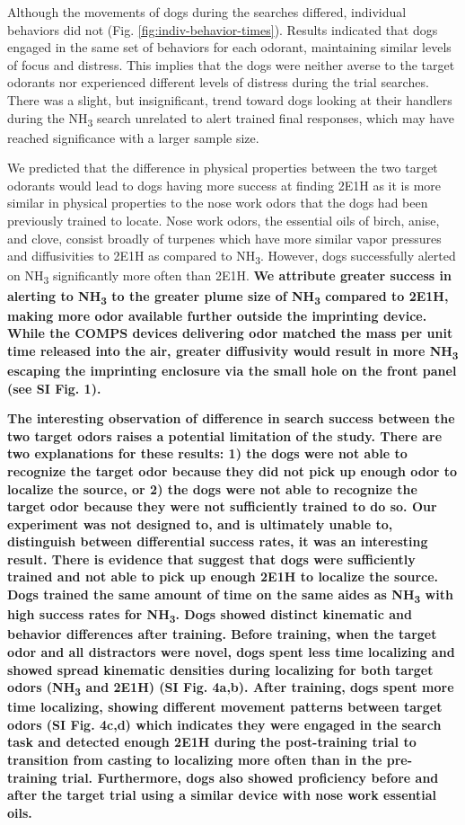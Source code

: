 \documentclass[
]{article}
\begin{document}
Although the movements of dogs during the searches differed, individual behaviors did not (Fig. \ref{fig:indiv-behavior-times}). Results indicated that dogs engaged in the same set of behaviors for each odorant, maintaining similar levels of focus and distress. This implies that the dogs were neither averse to the target odorants nor experienced different levels of distress during the trial searches. There was a slight, but insignificant, trend toward dogs looking at their handlers during the NH\textsubscript{3} search unrelated to alert trained final responses, which may have reached significance with a larger sample size.

We predicted that the difference in physical properties between the two target odorants would lead to dogs having more success at finding 2E1H as it is more similar in physical properties to the nose work odors that the dogs had been previously trained to locate. Nose work odors, the essential oils of birch, anise, and clove, consist broadly of turpenes which have more similar vapor pressures and diffusivities to 2E1H as compared to NH\textsubscript{3}. However, dogs successfully alerted on NH\textsubscript{3} significantly more often than 2E1H. \textbf{We attribute greater success in alerting to NH\textsubscript{3} to the greater plume size of NH\textsubscript{3} compared to 2E1H, making more odor available further outside the imprinting device. While the COMPS devices delivering odor matched the mass per unit time released into the air, greater diffusivity would result in more NH\textsubscript{3} escaping the imprinting enclosure via the small hole on the front panel (see SI Fig. 1).}

\textbf{The interesting observation of difference in search success between the two target odors raises a potential limitation of the study. There are two explanations for these results: 1) the dogs were not able to recognize the target odor because they did not pick up enough odor to localize the source, or 2) the dogs were not able to recognize the target odor because they were not sufficiently trained to do so. Our experiment was not designed to, and is ultimately unable to, distinguish between differential success rates, it was an interesting result. There is evidence that suggest that dogs were sufficiently trained and not able to pick up enough 2E1H to localize the source. Dogs trained the same amount of time on the same aides as NH\textsubscript{3} with high success rates for NH\textsubscript{3}. Dogs showed distinct kinematic and behavior differences after training. Before training, when the target odor and all distractors were novel, dogs spent less time localizing and showed spread kinematic densities during localizing for both target odors (NH\textsubscript{3} and 2E1H) (SI Fig. 4a,b). After training, dogs spent more time localizing, showing different movement patterns between target odors (SI Fig. 4c,d) which indicates they were engaged in the search task and detected enough 2E1H during the post-training trial to transition from casting to localizing more often than in the pre-training trial. Furthermore, dogs also showed proficiency before and after the target trial using a similar device with nose work essential oils.}
\end{document}
